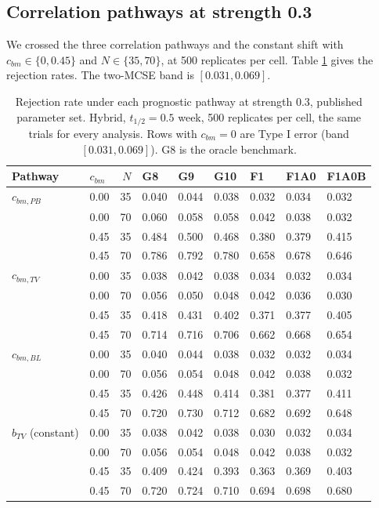 \documentclass[
  11pt,
]{article}
\begin{document}
\subsection{Correlation pathways at strength 0.3}\label{sec-stress}

We crossed the three correlation pathways and the constant shift
with \(c_{bm} \in \{0, 0.45\}\) and \(N \in \{35, 70\}\), at
500 replicates per cell. Table \ref{tab:tab-stress} gives
the rejection rates. The two-MCSE band is \([0.031, 0.069]\).

\begin{table}
\centering
\caption{\label{tab:tab-stress}Rejection rate under each prognostic pathway
      at strength 0.3, published parameter set. Hybrid, $t_{1/2} =
      0.5$ week, 500 replicates per cell, the same trials for every
      analysis. Rows with $c_{bm} = 0$ are Type I error (band $[0.031, 0.069]$).
      G8 is the oracle benchmark.}
\centering
\fontsize{9}{11}\selectfont
\begin{tabular}[t]{llrllllll}
\toprule
Pathway & $c_{bm}$ & $N$ & G8 & G9 & G10 & F1 & F1A0 & F1A0B\\
\midrule
$c_{bm,PB}$ & 0.00 & 35 & 0.040 & 0.044 & 0.038 & 0.032 & 0.034 & 0.032\\
 & 0.00 & 70 & 0.060 & 0.058 & 0.058 & 0.042 & 0.038 & 0.032\\
 & 0.45 & 35 & 0.484 & 0.500 & 0.468 & 0.380 & 0.379 & 0.415\\
 & 0.45 & 70 & 0.786 & 0.792 & 0.780 & 0.658 & 0.678 & 0.646\\
$c_{bm,TV}$ & 0.00 & 35 & 0.038 & 0.042 & 0.038 & 0.034 & 0.032 & 0.034\\
 & 0.00 & 70 & 0.056 & 0.050 & 0.048 & 0.042 & 0.036 & 0.030\\
 & 0.45 & 35 & 0.418 & 0.431 & 0.402 & 0.371 & 0.377 & 0.405\\
 & 0.45 & 70 & 0.714 & 0.716 & 0.706 & 0.662 & 0.668 & 0.654\\
$c_{bm,BL}$ & 0.00 & 35 & 0.040 & 0.044 & 0.038 & 0.032 & 0.032 & 0.034\\
 & 0.00 & 70 & 0.056 & 0.054 & 0.048 & 0.042 & 0.038 & 0.032\\
 & 0.45 & 35 & 0.426 & 0.448 & 0.414 & 0.381 & 0.377 & 0.411\\
 & 0.45 & 70 & 0.720 & 0.730 & 0.712 & 0.682 & 0.692 & 0.648\\
$b_{TV}$ (constant) & 0.00 & 35 & 0.038 & 0.042 & 0.038 & 0.030 & 0.032 & 0.034\\
 & 0.00 & 70 & 0.056 & 0.054 & 0.048 & 0.042 & 0.038 & 0.032\\
 & 0.45 & 35 & 0.409 & 0.424 & 0.393 & 0.363 & 0.369 & 0.403\\
 & 0.45 & 70 & 0.720 & 0.724 & 0.710 & 0.694 & 0.698 & 0.680\\
\bottomrule
\end{tabular}
\end{table}
\end{document}
